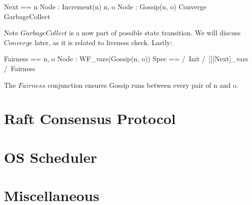 \documentclass{report}
\begin{document}
\begin{tla}
    Next ==
        \/ \E n \in Node : Increment(n)
        \/ \E n, o \in Node : Gossip(n, o)
        \/ Converge
        \/ GarbageCollect
\end{tla}
\begin{tlatex}
%
%
%
%
%
\end{tlatex}

Note $GarbageCollect$ is a now part of possible state transition. We will
discuss $Converge$ later, as it is related to liveness check. Lastly: 

\begin{tla}
    Fairness == \A n, o \in Node : WF_vars(Gossip(n, o))
    Spec ==
        /\ Init
        /\ [][Next]_vars
        /\ Fairness
\end{tla}
\begin{tlatex}
%
%
%
%
\end{tlatex}

The $Fairness$ conjunction ensures Gossip runs between every pair of n and o. 

\chapter{Raft Consensus Protocol}

\chapter{OS Scheduler}

\chapter{Miscellaneous}
\end{document}
